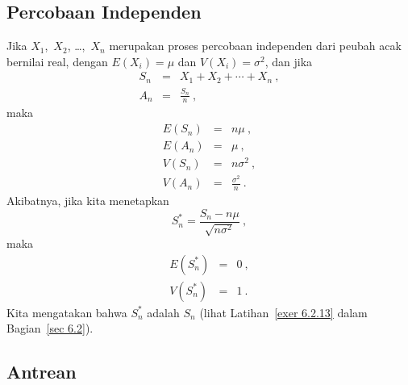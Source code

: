 {\subsection*{Percobaan Independen}

\begin{corollary}\label{cor 6.1}                                                
Jika $X_1$,~$X_2$, \dots,~$X_n$ merupakan proses percobaan independen dari peubah
acak bernilai real, dengan $E(X_i) = \mu$ dan $V(X_i) = \sigma^2$, dan jika
\begin{eqnarray*} S_n & = & X_1 + X_2 +\cdots+ X_n\ , \\ A_n & = & \frac {S_n}n\ ,
\end{eqnarray*} 
maka
\begin{eqnarray*}
E(S_n) & = & n\mu\ ,\\
E(A_n) & = & \mu\ ,\\
V(S_n) & = & n\sigma^2\ ,\\
V(A_n) & = & \frac {\sigma^2} n\ .
\end{eqnarray*}
Akibatnya, jika kita menetapkan
$$ 
S_n^* = \frac {S_n - n\mu}{\sqrt{n\sigma^2}}\ ,
$$ 
maka
\begin{eqnarray*} 
E(S_n^*) & = & 0\ ,\\
V(S_n^*) & = & 1\ .
\end{eqnarray*}
Kita mengatakan bahwa $S_n^*$ adalah  $S_n$ (lihat
Latihan~\ref{exer 6.2.13} dalam Bagian~\ref{sec 6.2}).
\end{corollary}


\subsection*{Antrean}

}
